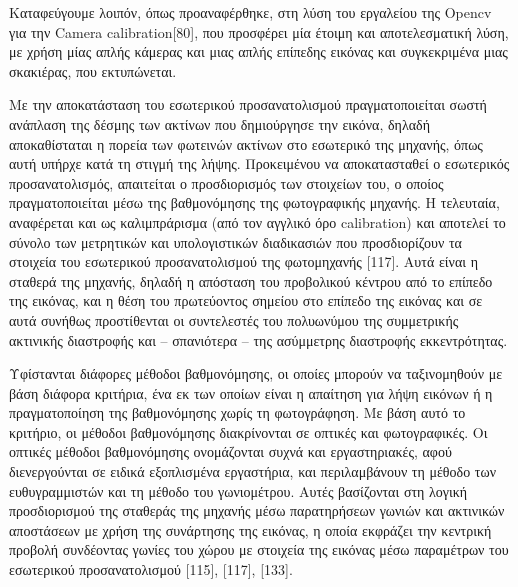 Καταφεύγουμε λοιπόν, όπως προαναφέρθηκε, στη λύση του εργαλείου της Opencv για την Camera calibration[80], που προσφέρει μία έτοιμη και αποτελεσματική λύση, με χρήση μίας απλής κάμερας και μιας απλής επίπεδης εικόνας και συγκεκριμένα μιας σκακιέρας, που εκτυπώνεται. 



Με την αποκατάσταση του εσωτερικού προσανατολισμού πραγματοποιείται σωστή ανάπλαση της δέσμης των ακτίνων που δημιούργησε την εικόνα, δηλαδή αποκαθίσταται η πορεία των φωτεινών ακτίνων στο εσωτερικό της μηχανής, όπως αυτή υπήρχε κατά τη στιγμή της λήψης. Προκειμένου να αποκατασταθεί ο εσωτερικός προσανατολισμός, απαιτείται ο προσδιορισμός των στοιχείων του, ο οποίος πραγματοποιείται μέσω της βαθμονόμησης της φωτογραφικής μηχανής. Η τελευταία, αναφέρεται και ως καλιμπράρισμα (από τον αγγλικό όρο calibration) και αποτελεί το σύνολο των μετρητικών και υπολογιστικών διαδικασιών που προσδιορίζουν τα στοιχεία του εσωτερικού προσανατολισμού της φωτομηχανής [117]. Αυτά είναι η σταθερά της μηχανής, δηλαδή η απόσταση του προβολικού κέντρου από το επίπεδο της εικόνας, και η θέση του πρωτεύοντος σημείου στο επίπεδο της εικόνας και σε αυτά συνήθως προστίθενται οι συντελεστές του πολυωνύμου της συμμετρικής ακτινικής διαστροφής και – σπανιότερα – της ασύμμετρης διαστροφής εκκεντρότητας.


Υφίστανται διάφορες μέθοδοι βαθμονόμησης, οι οποίες μπορούν να ταξινομηθούν με βάση διάφορα κριτήρια, ένα εκ των οποίων είναι η απαίτηση για λήψη εικόνων ή η πραγματοποίηση της βαθμονόμησης χωρίς τη φωτογράφηση. Με βάση αυτό το κριτήριο, οι μέθοδοι βαθμονόμησης διακρίνονται σε οπτικές και φωτογραφικές. Οι οπτικές μέθοδοι βαθμονόμησης ονομάζονται συχνά και εργαστηριακές, αφού διενεργούνται σε ειδικά εξοπλισμένα εργαστήρια, και περιλαμβάνουν τη μέθοδο των ευθυγραμμιστών και τη μέθοδο του γωνιομέτρου. Αυτές βασίζονται στη λογική προσδιορισμού της σταθεράς της μηχανής μέσω παρατηρήσεων γωνιών και ακτινικών αποστάσεων με χρήση της συνάρτησης της εικόνας, η οποία εκφράζει την κεντρική προβολή συνδέοντας γωνίες του χώρου με στοιχεία της εικόνας μέσω παραμέτρων του εσωτερικού προσανατολισμού [115], [117], [133].


